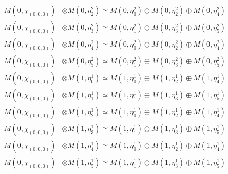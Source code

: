 \begin{align*}
M(0,\chi_{(0,0,0)}) &\otimes M(0,\eta^{2}_{2}) \simeq M(0,\eta^{2}_{0}) \oplus M(0,\eta^{2}_{2}) \oplus M(0,\eta^{2}_{4}) \\
M(0,\chi_{(0,0,0)}) &\otimes M(0,\eta^{2}_{3}) \simeq M(0,\eta^{2}_{1}) \oplus M(0,\eta^{2}_{3}) \oplus M(0,\eta^{2}_{5}) \\
M(0,\chi_{(0,0,0)}) &\otimes M(0,\eta^{2}_{4}) \simeq M(0,\eta^{2}_{0}) \oplus M(0,\eta^{2}_{2}) \oplus M(0,\eta^{2}_{4}) \\
M(0,\chi_{(0,0,0)}) &\otimes M(0,\eta^{2}_{5}) \simeq M(0,\eta^{2}_{1}) \oplus M(0,\eta^{2}_{3}) \oplus M(0,\eta^{2}_{5}) \\
M(0,\chi_{(0,0,0)}) &\otimes M(1,\eta^{1}_{0}) \simeq M(1,\eta^{1}_{0}) \oplus M(1,\eta^{1}_{2}) \oplus M(1,\eta^{1}_{4}) \\
M(0,\chi_{(0,0,0)}) &\otimes M(1,\eta^{1}_{1}) \simeq M(1,\eta^{1}_{1}) \oplus M(1,\eta^{1}_{3}) \oplus M(1,\eta^{1}_{5}) \\
M(0,\chi_{(0,0,0)}) &\otimes M(1,\eta^{1}_{2}) \simeq M(1,\eta^{1}_{0}) \oplus M(1,\eta^{1}_{2}) \oplus M(1,\eta^{1}_{4}) \\
M(0,\chi_{(0,0,0)}) &\otimes M(1,\eta^{1}_{3}) \simeq M(1,\eta^{1}_{1}) \oplus M(1,\eta^{1}_{3}) \oplus M(1,\eta^{1}_{5}) \\
M(0,\chi_{(0,0,0)}) &\otimes M(1,\eta^{1}_{4}) \simeq M(1,\eta^{1}_{0}) \oplus M(1,\eta^{1}_{2}) \oplus M(1,\eta^{1}_{4}) \\
M(0,\chi_{(0,0,0)}) &\otimes M(1,\eta^{1}_{5}) \simeq M(1,\eta^{1}_{1}) \oplus M(1,\eta^{1}_{3}) \oplus M(1,\eta^{1}_{5}) \\
\end{align*}

